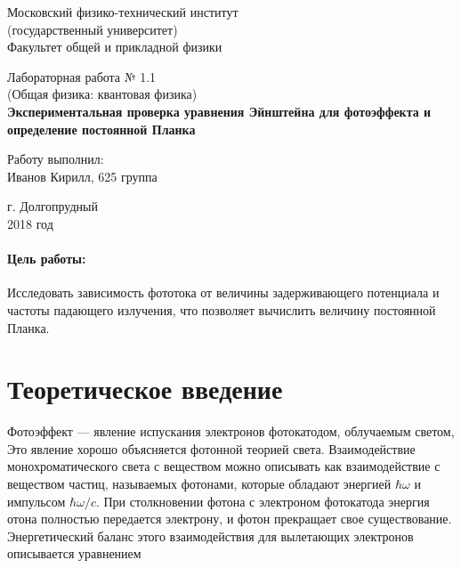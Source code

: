 \documentclass[12pt]{kiarticle} %
\begin{document}
	
	\begin{titlepage}
		\begin{center}
			\large 	Московский физико-технический институт \\
			(государственный университет) \\
			Факультет общей и прикладной физики \\
			\vspace{0.2cm}
			
			\vspace{4.5cm}
			Лабораторная работа № 1.1  \\ \vspace{0.2cm}
			\large (Общая физика: квантовая физика) \\ \vspace{0.2cm}
			\LARGE \textbf{ Экспериментальная проверка уравнения Эйнштейна
				для фотоэффекта и определение постоянной Планка }
		\end{center}
		\vspace{2.3cm} \large
		
		\begin{center}
			Работу выполнил: \\
			Иванов Кирилл,
			625 группа
			\vspace{10mm}		
			
		\end{center}
		
		\begin{center} \vspace{60mm}
			г. Долгопрудный \\
			2018 год
		\end{center}
	\end{titlepage}


	\paragraph*{Цель работы:} 
	Исследовать зависимость фототока от величины задерживающего потенциала и частоты падающего излучения, что позволяет вычислить величину постоянной Планка.
	
	\section{Теоретическое введение}
	
	Фотоэффект --- явление испускания электронов фотокатодом, облучаемым светом,  Это явление хорошо объясняется фотонной теорией света. Взаимодействие монохроматического света с веществом можно описывать
	как взаимодействие с веществом частиц, называемых фотонами, которые обладают энергией $ \hbar \omega $ и импульсом $ \hbar\omega/c $. При столкновении фотона с электроном фотокатода энергия отона полностью передается электрону, и фотон прекращает свое существование. Энергетический баланс этого взаимодействия для вылетающих электронов
	описывается уравнением
	
\end{document}

